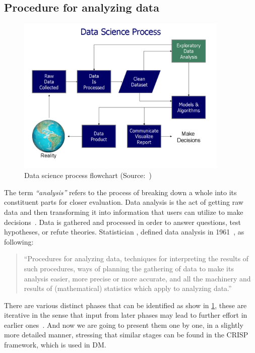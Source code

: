 \subsection{Procedure for analyzing data}\label{subsect:data_analysis_proc}
\begin{figure}[t]
    \centering
    \includegraphics[width=0.9\textwidth]{content/chapter_1/images/Data_visualization_process_v1.png}
    \caption{Data science process flowchart (Source:~\cite{Book:doing_data_science})}
    \label{fig:data-science-flowchart}
\end{figure}
The term \textit{``analysis''} refers to the process of breaking down a whole into its constituent parts for closer evaluation.
Data analysis is the act of getting raw data and then transforming it into information that users can utilize to make decisions~\cite{Book:sbrown_2014_transforming}.
Data is gathered and processed in order to answer questions, test hypotheses, or refute theories.
Statistician \citeauthor{Article:future_of_data_tukey}, defined data analysis in 1961~\cite{Article:future_of_data_tukey}, as following:
\begin{quote}
    ``Procedures for analyzing data, techniques for interpreting the results of such procedures, ways of planning the gathering of data to make its analysis easier, 
    more precise or more accurate, and all the machinery and results of (mathematical) statistics which apply to analyzing data.''
\end{quote}
There are various distinct phases that can be identified as show in \ref{fig:data-science-flowchart}, these are iterative in the sense that input from later phases may lead to further effort in earlier ones~\cite{Book:doing_data_science}.
And now we are going to present them one by one, in a slightly more detailed manner, stressing that similar stages can be found in the \ac{CRISP} framework, which is used in \acl{DM}.

